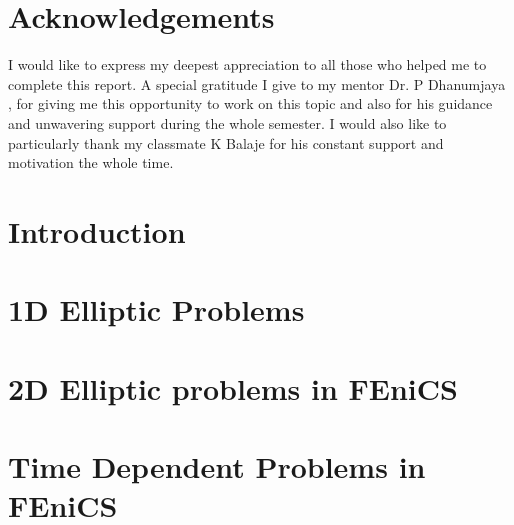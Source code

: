 \documentclass[11pt]{report}
\begin{document}
	\chapter*{Acknowledgements}
I would like to express my deepest appreciation to all those who helped me to complete this report. A special gratitude I give to my mentor Dr. P Dhanumjaya , for giving me this opportunity to work on this topic and also for his guidance and unwavering support during the whole semester. I would also like to particularly thank my classmate K Balaje for his constant support and motivation the whole time.
	\tableofcontents

	\chapter{Introduction}
	
	
	\chapter{1D Elliptic Problems}
	
	
	\chapter{2D Elliptic problems in FEniCS}
	
	
	\chapter{Time Dependent Problems in FEniCS}
	
\end{document}
